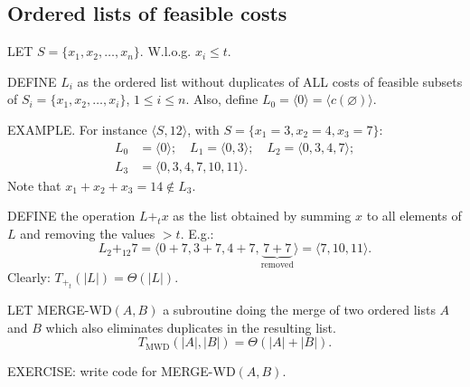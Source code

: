 \subsection{Ordered lists of feasible costs}
LET $S=\{x_1,x_2,\ldots,x_n\}$. W.l.o.g. $x_i\leq t$.
\begin{notesdefinition}
DEFINE $L_i$ as the ordered list without duplicates of ALL costs of feasible subsets of $S_i=\{x_1,x_2,\ldots,x_i\}$, $1\leq i\leq n$.
Also, define $L_0=\langle0\rangle=\langle c(\varnothing)\rangle$.
\end{notesdefinition}
\begin{notesresult}
EXAMPLE. For instance $\langle S,12\rangle$, with $S=\{x_1=3,x_2=4,x_3=7\}$:
\begin{align*}
L_0&=\langle0\rangle;\quad L_1=\langle0,3\rangle;\quad L_2=\langle0,3,4,7\rangle;\\
L_3&=\langle0,3,4,7,10,11\rangle.
\end{align*}
Note that $x_1+x_2+x_3=14\notin L_3$.
\end{notesresult}
\begin{notesdefinition}
DEFINE the operation $L+_t x$ as the list obtained by summing $x$ to all elements of $L$ and removing the values $>t$.
E.g.:
\[L_2+_{12}7=\langle0+7,3+7,4+7,\underbrace{7+7}_{\text{removed}}\rangle
=\langle7,10,11\rangle.\]
Clearly: $T_{+_t}(|L|)=\Theta(|L|)$.
\end{notesdefinition}
\begin{notesdefinition}
LET MERGE-WD$(A,B)$ a subroutine doing the merge of two ordered lists $A$ and $B$ which also eliminates duplicates in the resulting list.
\[T_{\mathrm{MWD}}(|A|,|B|)=\Theta(|A|+|B|).\]
\end{notesdefinition}
\begin{notesresult}
EXERCISE: write code for MERGE-WD$(A,B)$.
\end{notesresult}
